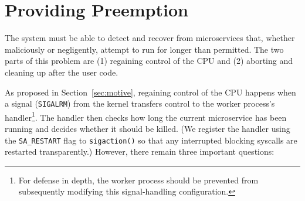 \section{Providing Preemption}
\label{sec:preemption}

% 
% 



The system must be able to detect and recover from microservices that, whether
maliciously or negligently, attempt to run for longer than permitted.  The two parts
of this problem are (1) regaining control of the CPU and (2) aborting and cleaning up
after the user code.

As proposed in Section~\ref{sec:motive}, regaining control of the CPU happens when a
signal (\texttt{SIGALRM}) from the kernel transfers control to the worker process's
handler\footnote{For defense in depth, the worker process should be prevented from
subsequently modifying this signal-handling configuration.}.  The handler then checks
how long the current microservice has been running
and decides whether it should be killed.  (We register the handler using the
\texttt{SA\_RESTART} flag to \texttt{sigaction()} so that any interrupted blocking
syscalls are restarted transparently.)  However, there remain three important
questions:

